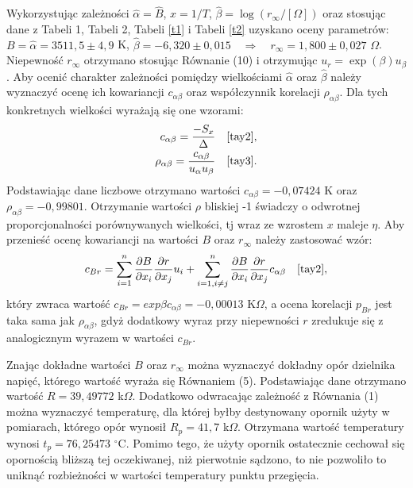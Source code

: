 \documentclass[10pt,a4paper]{article}
\begin{document}
Wykorzystując zależności $\hat{\alpha}=\hat{B}$, $x=1/T$, $\hat{\beta}=\log{\left(r_{\infty}/[\Omega]\right)}$ oraz stosując dane z Tabeli 1, Tabeli 2, Tabeli \ref{t1} i Tabeli \ref{t2} uzyskano oceny parametrów: $B=\hat{\alpha}=3511,5\pm4,9$ K, $\hat{\beta}=-6,320\pm0,015 \quad \Rightarrow \quad r_{\infty}=1,800\pm0,027$ $\Omega$. 
Niepewność $r_{\infty}$ otrzymano stosując Równanie (10) i otrzymując $u_{r}=\exp{(\beta)}u_{\beta}$.
Aby ocenić charakter zależności pomiędzy wielkościami $\hat{\alpha}$ oraz $\hat{\beta}$ należy wyznaczyć ocenę ich kowariancji $c_{\alpha \beta}$ oraz współczynnik korelacji $\rho_{\alpha \beta}$. Dla tych konkretnych wielkości wyrażają się one wzorami:
\begin{eqnarray}
 c_{\alpha \beta}=\dfrac{-S_{x}}{\Delta} \quad \cite{tay2}, \\
 \rho_{\alpha \beta}=\dfrac{c_{\alpha \beta}}{u_{\alpha} u_{\beta}} \quad \cite{tay3}.
 \end{eqnarray}
Podstawiając dane liczbowe otrzymano wartości $c_{\alpha \beta}=-0,07424$ K oraz $\rho_{\alpha \beta}=-0,99801$. Otrzymanie wartości $\rho$ bliskiej -1 świadczy o odwrotnej proporcjonalności porównywanych wielkości, tj wraz ze wzrostem $x$ maleje $\eta$. Aby przenieść ocenę kowariancji na wartości $B$ oraz $r_{\infty}$ należy zastosować wzór:
\begin{equation}
c_{Br}=\sum_{i=1}^n \dfrac{\partial B}{\partial x_{i}}\dfrac{\partial r}{\partial x_{j}}u_{i}+\sum_{i=1,i\neq j}^n \dfrac{\partial B}{\partial x_{i}}\dfrac{\partial r}{\partial x_{j}}c_{\alpha \beta} \quad \cite{tay2},
\end{equation}
który zwraca wartość $c_{Br}=exp{\beta}c_{\alpha \beta}=-0,00013$ K$\Omega$, a ocena korelacji $p_{Br}$ jest taka sama jak $\rho_{\alpha \beta}$, gdyż dodatkowy wyraz przy niepewności $r$ zredukuje się z analogicznym wyrazem w wartości $c_{Br}$. 

Znając dokładne wartości $B$ oraz $r_{\infty}$ można wyznaczyć dokładny opór dzielnika napięć, którego wartość wyraża się Równaniem (5). Podstawiając dane otrzymano wartość $R=39,49772$ k$\Omega$. Dodatkowo odwracając zależność z Równania (1) można wyznaczyć temperaturę, dla której byłby destynowany opornik użyty w pomiarach, którego opór wynosił $R_{p}=41,7$ k$\Omega$. Otrzymana wartość temperatury wynosi $t_{p}=76,25473$ $^{\circ}$C. Pomimo tego, że użyty opornik ostatecznie cechował się opornością bliższą tej oczekiwanej, niż pierwotnie sądzono, to nie pozwoliło to uniknąć rozbieżności w wartości temperatury punktu przegięcia. 
\end{document}
